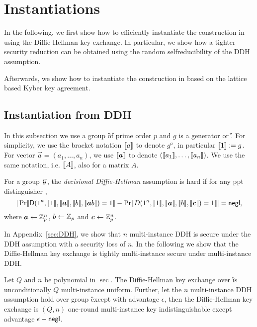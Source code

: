 \section{Instantiations}\label{sec:inst}
In the following, we first show how to efficiently instantiate the construction in  using the Diffie-Hellman key exchange. In particular, we show how a tighter security reduction can be obtained using the random selfreducibility of the DDH assumption.

Afterwards, we show how to instantiate the construction in  based on the lattice based Kyber key agreement. 


\subsection{Instantiation from DDH}

In this subsection we use a group \G of prime order $p$ and $g$ is a generator or \G. For simplicity, we use the bracket notation $\llbracket a\rrbracket$ to denote $g^a$, in particular $\llbracket 1\rrbracket:=g$. For vector $\vec{a}=(a_1,\ldots,a_n)$, we use $\lb \vec{a}\rb$ to denote $(\llbracket a_1\rrbracket,\ldots,\llbracket a_n\rrbracket)$. We use the same notation, i.e. $\llbracket A\rrbracket$, also for a matrix $A$.



\begin{definition}
For a group $\mathcal{G}$, the \emph{decisional Diffie-Hellman} assumption is hard if for any ppt distinguisher \D,
$$
|\Pr\lb \D(1^\sec,\lb 1\rb,\lb \vec{a}\rb,\lb b\rb,\lb \vec{a}b\rb)=1\rb-\Pr\lb D(1^\sec,\lb 1\rb,\lb \vec{a}\rb,\lb b\rb,\lb \vec{c}\rb)=1\rb|=\negl,
$$
where $\vec{a}\leftarrow\Z_p^n$, $b\leftarrow\mathbb Z_p$ and $\vec{c}\leftarrow\Z_p^n$.
\end{definition}

In Appendix~\ref{sec:DDH}, we show that $n$ multi-instance DDH is secure under the DDH assumption with a security loss of $n$. In the following we show that the Diffie-Hellman key exchange is tightly multi-instance secure under multi-instance DDH. 

\begin{lemma}\label{lem:DDH}
Let $Q$ and $n$ be polynomial in $\sec$.
The Diffie-Hellman key exchange over \G is unconditionally $Q$ multi-instance uniform. Further, let the $n$ multi-instance DDH assumption hold over group \G except with advantage $\epsilon$, then the Diffie-Hellman key exchange is $(Q,n)$ one-round multi-instance key indistinguishable except advantage $\epsilon-\mathsf{negl}$. 
\end{lemma}

